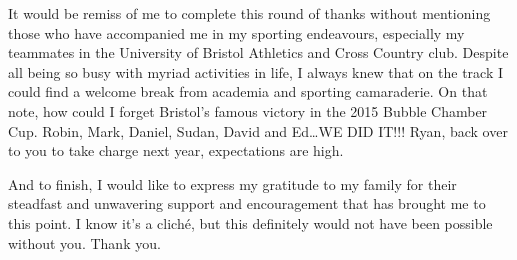 It would be remiss of me to complete this round of thanks without mentioning those who have accompanied me in
my sporting endeavours, especially my teammates in the University of Bristol Athletics and Cross Country club.
Despite all being so busy with myriad activities in life, I always knew that on the track I could find a
welcome break from academia and sporting camaraderie. On that note, how could I forget Bristol's famous
victory in the 2015 Bubble Chamber Cup. Robin, Mark, Daniel, Sudan, David and Ed\ldots WE DID IT!!! Ryan, back
over to you to take charge next year, expectations are high.

And to finish, I would like to express my gratitude to my family for their steadfast and unwavering support
and encouragement that has brought me to this point. I know it's a clich\'{e}, but this definitely would not
have been possible without you. Thank you.
